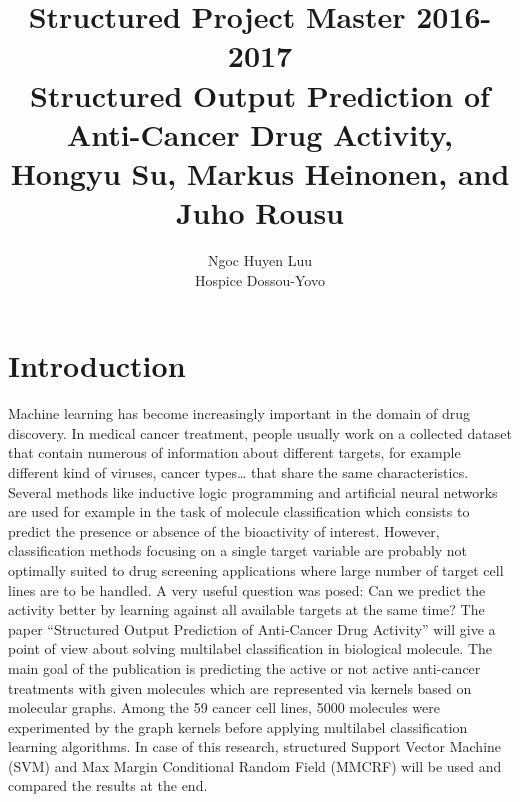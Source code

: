 \documentclass[12pt]{article}
\begin{document}
	

	
	\title{\textbf{Structured Project Master 2016-2017 \\ Structured Output Prediction of Anti-Cancer Drug Activity}, Hongyu Su, Markus Heinonen, and Juho Rousu}%
	\author{Ngoc Huyen Luu\\ Hospice Dossou-Yovo
		}

	\maketitle

\section*{Introduction}
Machine learning has become increasingly important in the domain of drug discovery. In medical cancer treatment, people usually work on a collected dataset that contain numerous of information about different targets, for example different kind of viruses, cancer types… that share the same characteristics. Several methods like inductive logic programming and artificial neural networks are used for example in the task of molecule classification which consists to predict the presence or absence of the bioactivity of interest. However, classification methods focusing on a single target variable are probably not optimally suited to drug screening applications where large number of target cell lines are to be handled. A very useful question was posed: Can we predict the activity better by learning against all available targets at the same time? The paper “Structured Output Prediction of Anti-Cancer Drug Activity” will give a point of view about solving multilabel classification in biological molecule. The main goal of the publication is predicting the active or not active anti-cancer treatments with given molecules which are represented via kernels based on molecular graphs. Among the 59 cancer cell lines, 5000 molecules were experimented by the graph kernels before applying multilabel classification learning algorithms. In case of this research, structured Support Vector Machine (SVM) and Max Margin Conditional Random Field (MMCRF) will be used and compared the results at the end.
\end{document}
